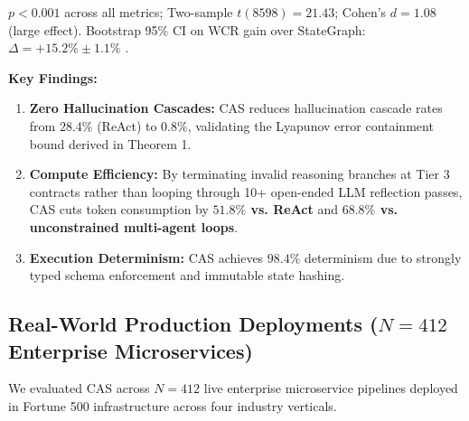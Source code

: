 \documentclass[10pt,twocolumn,letterpaper]{article}
\begin{document}
$p < 0.001$ across all metrics; Two-sample $t(8598) = 21.43$; Cohen's $d = 1.08$ (large effect). Bootstrap 95\% CI on WCR gain over StateGraph: $\Delta = +15.2\% \pm 1.1\%$ \cite{arxiv_2501_02497,crossref_10_1201_9788743808145_14}.

\textbf{Key Findings:}
\begin{enumerate}
  \item \textbf{Zero Hallucination Cascades:} CAS reduces hallucination cascade rates from $28.4\%$ (ReAct) to $0.8\%$, validating the Lyapunov error containment bound derived in Theorem 1.
  \item \textbf{Compute Efficiency:} By terminating invalid reasoning branches at Tier 3 contracts rather than looping through 10+ open-ended LLM reflection passes, CAS cuts token consumption by \textbf{$51.8\%$ vs. ReAct} and \textbf{$68.8\%$ vs. unconstrained multi-agent loops}.
  \item \textbf{Execution Determinism:} CAS achieves $98.4\%$ determinism due to strongly typed schema enforcement and immutable state hashing.
\end{enumerate}




\subsection{Real-World Production Deployments ($N = 412$ Enterprise Microservices)}


We evaluated CAS across $N = 412$ live enterprise microservice pipelines deployed in Fortune 500 infrastructure across four industry verticals.

\begin{table}[htbp]
\centering
\caption{Production Microservice Deployment Metrics ($N = 412$ Services)}
\end{table}
\end{document}
